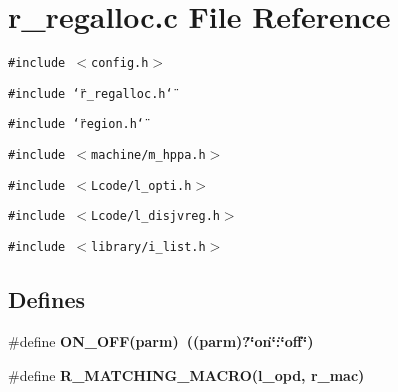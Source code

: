 \section{r\_\-regalloc.c File Reference}
\label{r__regalloc_8c}
{\tt \#include $<$config.h$>$}\par
{\tt \#include \char`\"{}r\_\-regalloc.h\char`\"{}}\par
{\tt \#include \char`\"{}region.h\char`\"{}}\par
{\tt \#include $<$machine/m\_\-hppa.h$>$}\par
{\tt \#include $<$Lcode/l\_\-opti.h$>$}\par
{\tt \#include $<$Lcode/l\_\-disjvreg.h$>$}\par
{\tt \#include $<$library/i\_\-list.h$>$}\par
\subsection*{Defines}
\begin{CompactItemize}
\item 
\#define \bf{ON\_\-OFF}(parm)~((parm)?\char`\"{}on\char`\"{}:\char`\"{}off\char`\"{})
\item 
\#define \bf{R\_\-MATCHING\_\-MACRO}(l\_\-opd, r\_\-mac)
\end{CompactItemize}
